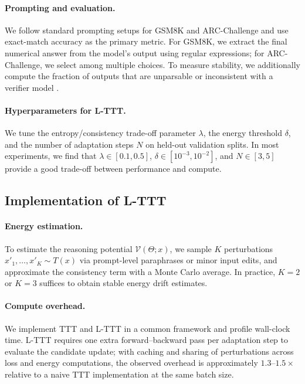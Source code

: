 \documentclass{article}
\theoremstyle{plain}
\theoremstyle{definition}
\theoremstyle{remark}
\newcommand{\Lyap}{\mathcal{V}}            %
\begin{document}
\paragraph{Prompting and evaluation.}
We follow standard prompting setups for GSM8K and ARC-Challenge and use exact-match accuracy as the primary metric. For GSM8K, we extract the final numerical answer from the model's output using regular expressions; for ARC-Challenge, we select among multiple choices. To measure stability, we additionally compute the fraction of outputs that are unparsable or inconsistent with a verifier model \cite{selfconsistency2022,lightman2024let}.

\paragraph{Hyperparameters for L-TTT.}
We tune the entropy/consistency trade-off parameter $\lambda$, the energy threshold $\delta$, and the number of adaptation steps $N$ on held-out validation splits. In most experiments, we find that $\lambda \in [0.1,0.5]$, $\delta \in [10^{-3},10^{-2}]$, and $N \in [3,5]$ provide a good trade-off between performance and compute.

\subsection{Implementation of L-TTT}

\paragraph{Energy estimation.}
To estimate the reasoning potential $\Lyap(\Theta;x)$, we sample $K$ perturbations $x'_1,\dots,x'_K \sim T(x)$ via prompt-level paraphrases or minor input edits, and approximate the consistency term with a Monte Carlo average. In practice, $K=2$ or $K=3$ suffices to obtain stable energy drift estimates.

\paragraph{Compute overhead.}
We implement TTT and L-TTT in a common framework and profile wall-clock time. L-TTT requires one extra forward–backward pass per adaptation step to evaluate the candidate update; with caching and sharing of perturbations across loss and energy computations, the observed overhead is approximately $1.3$--$1.5\times$ relative to a naive TTT implementation at the same batch size.
\end{document}
